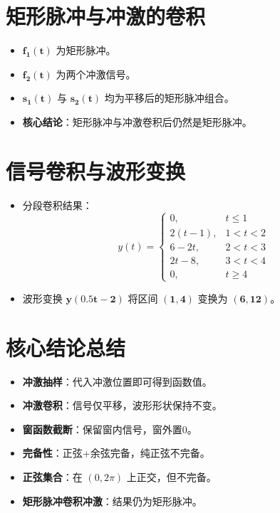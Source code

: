 \section{矩形脉冲与冲激的卷积}
\begin{itemize}
\item $\boldsymbol{f_1(t)}$ 为矩形脉冲。
\item $\boldsymbol{f_2(t)}$ 为两个冲激信号。
\item $\boldsymbol{s_1(t)}$ 与 $\boldsymbol{s_2(t)}$ 均为平移后的矩形脉冲组合。
\item \textbf{核心结论}：矩形脉冲与冲激卷积后仍然是矩形脉冲。
\end{itemize}

\section{信号卷积与波形变换}
\begin{itemize}
\item 分段卷积结果：
  \[
  y(t)=
  \begin{cases}
  0,&t\leq1\\
  2(t-1),&1<t<2\\
  6-2t,&2<t<3\\
  2t-8,&3<t<4\\
  0,&t\geq4
  \end{cases}
  \]
\item 波形变换 $\boldsymbol{y(0.5t-2)}$ 将区间 $\boldsymbol{(1,4)}$ 变换为 $\boldsymbol{(6,12)}$。
\end{itemize}

\section{核心结论总结}
\begin{tcolorbox}[colback=gray!5!white,colframe=black!70!blue,title=\textbf{考试必背结论}]
\begin{itemize}
    \item \textbf{冲激抽样}：代入冲激位置即可得到函数值。
    \item \textbf{冲激卷积}：信号仅平移，波形形状保持不变。
    \item \textbf{窗函数截断}：保留窗内信号，窗外置0。
    \item \textbf{完备性}：正弦+余弦完备，纯正弦不完备。
    \item \textbf{正弦集合}：在 $(0,2\pi)$ 上正交，但不完备。
    \item \textbf{矩形脉冲卷积冲激}：结果仍为矩形脉冲。
\end{itemize}
\end{tcolorbox}